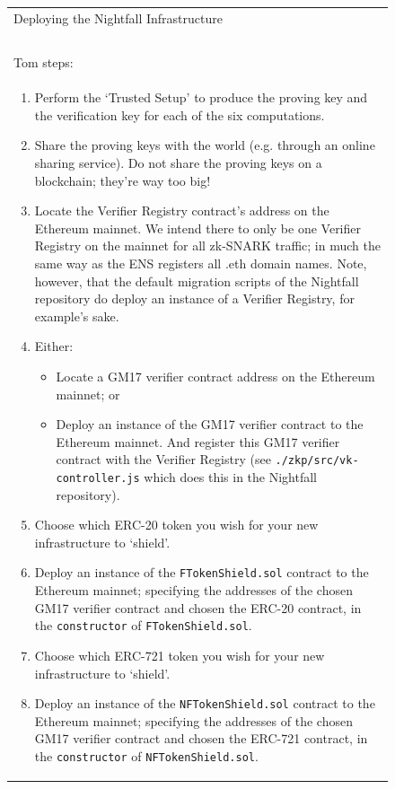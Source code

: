 \documentclass{article}
\begin{document}
\begin{figure}[H]
	\begin{center}
		\begin{framed}
      \begin{tabular}{p{16cm}}
        Deploying the Nightfall Infrastructure\\
        \ \\
        \hline
        Tom steps:\\
        \begin{enumerate}
				  \item Perform the `Trusted Setup' to produce the proving key and the verification key for each of the six computations.
				  \item Share the proving keys with the world (e.g. through an online sharing service). Do not share the proving keys on a blockchain; they're way too big!
				  \item Locate the Verifier Registry contract's address on the Ethereum mainnet. We intend there to only be one Verifier Registry on the mainnet for all zk-SNARK traffic; in much the same way as the ENS registers all .eth domain names. Note, however, that the default migration scripts of the Nightfall repository do deploy an instance of a Verifier Registry, for example's sake.
          \item Either:
          \begin{itemize}
            \item Locate a GM17 verifier contract address on the Ethereum mainnet; or
            \item Deploy an instance of the GM17 verifier contract to the Ethereum mainnet. And register this GM17 verifier contract with the Verifier Registry (see \texttt{./zkp/src/vk-controller.js} which does this in the Nightfall repository).
          \end{itemize}
          \item Choose which ERC-20 token you wish for your new infrastructure to `shield'.
          \item Deploy an instance of the \texttt{FTokenShield.sol} contract to the Ethereum mainnet; specifying the addresses of the chosen GM17 verifier contract and chosen the ERC-20 contract, in the \texttt{constructor} of \texttt{FTokenShield.sol}.
          \item Choose which ERC-721 token you wish for your new infrastructure to `shield'.
          \item Deploy an instance of the \texttt{NFTokenShield.sol} contract to the Ethereum mainnet; specifying the addresses of the chosen GM17 verifier contract and chosen the ERC-721 contract, in the \texttt{constructor} of \texttt{NFTokenShield.sol}.

\end{enumerate}
\end{tabular}
\end{framed}
\end{center}
\end{figure}
\end{document}
